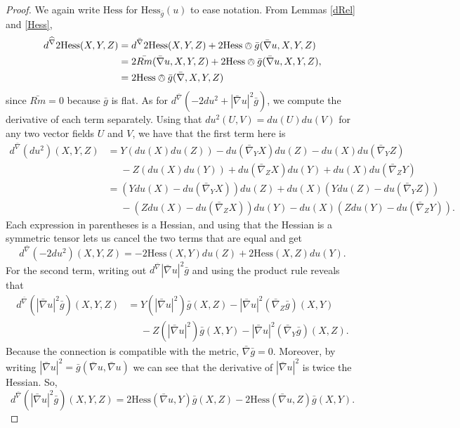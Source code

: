 \documentclass{amsart}
\begin{document}
\begin{proof}
We again write $\mathrm{Hess}$ for $\mathrm{Hess}_{\bar{g}}(u)$ to ease notation. 
From Lemmas \ref{dRel} and \ref{Hess}, 
\begin{equation}
\label{SimpDerHess}
\begin{aligned}
d^{\widehat{\nabla}}2\mathrm{Hess}(X,Y,Z)
&= d^{\bar{\nabla}}2\mathrm{Hess}(X,Y,Z) + 2\mathrm{Hess}\owedge \bar{g}(\bar{\nabla}u,X,Y,Z) \\
&= 2\bar{Rm}(\bar{\nabla}u,X,Y,Z) + 2\mathrm{Hess}\owedge \bar{g}(\bar{\nabla}u,X,Y,Z), \\
&= 2\mathrm{Hess}\owedge \bar{g}(\bar{\nabla},X,Y,Z)
\end{aligned}
\end{equation}
since $\bar{Rm} = 0$ because $\bar{g}$ is flat. 
As for $d^{\bar{\nabla}}(- 2 du^2 + |\bar{\nabla}u|^2 \bar{g})$, we compute the derivative of each term separately.
Using that $du^2(U,V) = du(U)du(V)$ for any two vector fields $U$ and $V$, we have that the first term here is 
\begin{align*}
d^{\bar{\nabla}}(du^2)(X,Y,Z)
&= Y(du(X)du(Z)) - du(\bar{\nabla}_YX)du(Z) - du(X)du(\bar{\nabla}_YZ) \\
&\phantom{=} - Z(du(X)du(Y)) + du(\bar{\nabla}_ZX)du(Y) + du(X)du(\bar{\nabla}_ZY) \\[2mm]
&= (Ydu(X) - du(\bar{\nabla}_YX))du(Z) + du(X)(Ydu(Z)-du(\bar{\nabla}_YZ)) \\
&\phantom{=} - (Zdu(X) - du(\bar{\nabla}_ZX))du(Y) - du(X)(Zdu(Y)-du(\bar{\nabla}_ZY)).
\end{align*}
Each expression in parentheses is a Hessian, and using that the Hessian is a symmetric tensor lets us cancel the two terms that are equal and get 
\begin{equation}
\label{Derdu}
d^{\bar{\nabla}}(-2du^2)(X,Y,Z) = -2\mathrm{Hess}(X,Y)du(Z) +2\mathrm{Hess}(X,Z)du(Y).
\end{equation}
For the second term, writing out $d^{\bar{\nabla}}|\bar{\nabla}u|^2 \bar{g}$ and using the product rule reveals that 
\begin{align*}
d^{\bar{\nabla}}(|\bar{\nabla}u|^2 \bar{g})(X,Y,Z) 
&= Y(|\bar{\nabla}u|^2)\bar{g}(X,Z) - |\bar{\nabla}u|^2 (\bar{\nabla}_Z\bar{g})(X,Y) \\
&\phantom{=} - Z(|\bar{\nabla}u|^2)\bar{g}(X,Y) - |\bar{\nabla}u|^2(\bar{\nabla}_Y\bar{g})(X,Z).
\end{align*}
Because the connection is compatible with the metric, $\bar{\nabla}\bar{g} = 0$. 
Moreover, by writing $|\bar{\nabla}u|^2 = \bar{g}(\bar{\nabla} u, \bar{\nabla}u)$ we can see that the derivative of $|\bar{\nabla}u|^2$ is twice the Hessian.
So, 
\begin{equation}
\label{DerNorm}
d^{\bar{\nabla}}(|\bar{\nabla} u|^2\bar{g})(X,Y,Z)
= 2\mathrm{Hess}(\bar{\nabla}u,Y)\bar{g}(X,Z) - 2\mathrm{Hess}(\bar{\nabla}u,Z)\bar{g}(X,Y).
\end{equation}


\end{proof}
\end{document}
